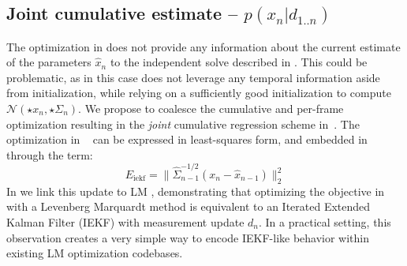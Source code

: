 \subsection{Joint cumulative estimate -- $p(x_n|d_{1..n})$}
\label{sec:joint}
The optimization in  does not provide any information about the current estimate of the parameters $\hat{x}_n$ to the independent solve described in . This could be problematic, as in this case  does not leverage any temporal information aside from initialization, while relying on a sufficiently good initialization to compute $\mathcal{N}(\star{x}_n, \star{\Sigma}_n)$. 
%
% 
% 
%
We propose to coalesce the cumulative and per-frame optimization resulting in the \emph{joint} cumulative regression scheme in~. 
The optimization in ~ can be expressed in least-squares form, and embedded in  through the term:
% 
\begin{equation}
E_\text{iekf} = \| \hat{\Sigma}^{-1/2}_{n - 1}(x_n - \hat{x}_{n - 1})\|_2^2 
\label{eq:iekflm}   
\end{equation}
%
In  we link this update to LM \cite{skoglund2015extended}, demonstrating that optimizing the objective in  with a Levenberg Marquardt method is equivalent to an Iterated Extended Kalman Filter (IEKF) with measurement update $d_n$.   In a practical setting, this observation creates a very simple way to encode IEKF-like behavior within existing LM optimization codebases.  


